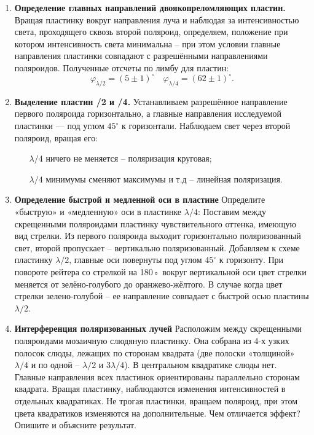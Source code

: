 \documentclass[12pt]{article}
\begin{document}
\begin{enumerate}
        \item \textbf{Определение главных направлений двоякопреломляющих пластин.}
        Вращая пластинку вокруг направления луча и наблюдая за интенсивностью света,
        проходящего сквозь второй поляроид, определяем, положение при котором
        интенсивность света минимальна -- при этом условии главные направления пластинки совпадают с
        разрешёнными направлениями поляроидов.
        Полученные отсчеты по лимбу для пластин:
        \[
            \varphi_{\lambda/2} = (5\pm1)^{\circ}\quad
            \varphi_{\lambda/4} = (62\pm1)^{\circ}.
        \]
        \item \textbf{Выделение пластин /2 и /4.}
        Устанавливаем разрешённое направление первого поляроида горизонтально, а главные направления исследуемой пластинки —
        под углом $45^{\circ}$ к горизонтали.
        Наблюдаем свет через второй поляроид, вращая его:
        \begin{itemize}
            \item[$\lambda/4$] ничего не меняется -- поляризация круговая;
            \item[$\lambda/4$] минимумы сменяют максимумы и т.д -- линейная поляризация.
        \end{itemize}

        \item \textbf{Определение быстрой и медленной оси в пластине}
        Определите «быструю» и «медленную» оси в пластинке $\lambda/4$:
        Поставим между скрещенными поляроидами пластинку чувствительного оттенка, имеющую вид стрелки.
        Из первого поляроида выходит горизонтально поляризованный свет, второй пропускает -- вертикально поляризованный.
        Добавляем к схеме пластинку $\lambda/2$, главные оси повернуты под углом $45^{\circ}$ к горизонту.
        При повороте рейтера со стрелкой на 180◦ вокруг вертикальной оси цвет стрелки меняется от зелёно-голубого до оранжево-жёлтого.
        В случае когда цвет стрелки зелено-голубой -- ее направление совпадает с быстрой осью пластины $\lambda/2$.

        \item \textbf{Интерференция поляризованных лучей}
        Расположим между скрещенными поляроидами мозаичную слюдяную пластинку.
        Она собрана из 4-х узких полосок слюды, лежащих по сторонам квадрата
        (две полоски «толщиной» $\lambda/4$ и по одной -- $\lambda/2$ и $3\lambda/4$).
        В центральном квадратике слюды нет.
        Главные направления всех пластинок ориентированы параллельно сторонам квадрата.
        Вращая пластинку, наблюдаются изменения интенсивностей в отдельных квадратиках.
        Не трогая пластинки, вращаем поляроид, при этом цвета квадратиков изменяются на дополнительные.
        Чем отличается эффект?
        Опишите и объясните результат.


\end{enumerate}
\end{document}
